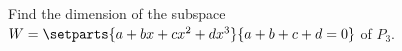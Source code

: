 Find the dimension of the subspace $W = \setparts{a + bx + cx^2 + dx^3}{a + b + c + d = 0}$ of $P_3$.